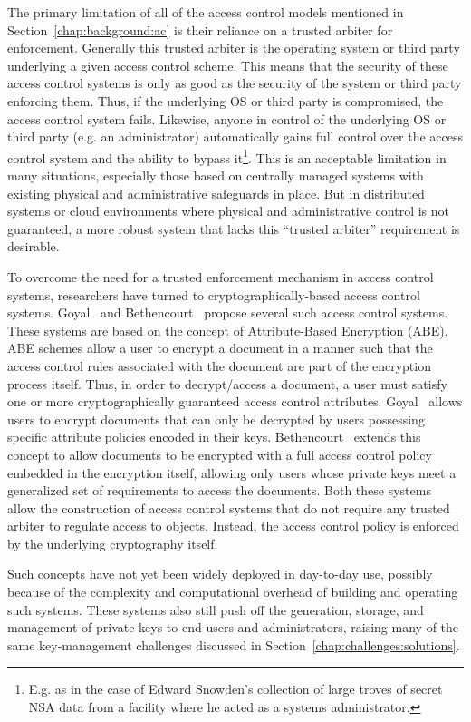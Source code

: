 The primary limitation of all of the access control models mentioned
in Section~\ref{chap:background:ac} is their reliance on a trusted
arbiter for enforcement. Generally this trusted arbiter is the
operating system or third party underlying a given access control
scheme. This means that the security of these access control systems
is only as good as the security of the system or third party enforcing
them. Thus, if the underlying OS or third party is compromised, the
access control system fails. Likewise, anyone in control of the
underlying OS or third party (e.g. an administrator) automatically
gains full control over the access control system and the ability to
bypass it\footnote{E.g. as in the case of Edward Snowden's collection
  of large troves of secret NSA data from a facility where he acted as
  a systems administrator.}. This is an acceptable limitation in many
situations, especially those based on centrally managed systems with
existing physical and administrative safeguards in place. But in
distributed systems or cloud environments where physical and
administrative control is not guaranteed, a more robust system that
lacks this ``trusted arbiter'' requirement is desirable.

To overcome the need for a trusted enforcement mechanism in access
control systems, researchers have turned to cryptographically-based
access control systems. Goyal~\cite{goyal2006} and
Bethencourt~\cite{bethencourt2007} propose several such access control
systems. These systems are based on the concept of Attribute-Based
Encryption (ABE). ABE schemes allow a user to encrypt a document in a
manner such that the access control rules associated with the document
are part of the encryption process itself. Thus, in order to
decrypt/access a document, a user must satisfy one or more
cryptographically guaranteed access control
attributes. Goyal~\cite{goyal2006} allows users to encrypt documents
that can only be decrypted by users possessing specific attribute
policies encoded in their keys. Bethencourt~\cite{bethencourt2007}
extends this concept to allow documents to be encrypted with a full
access control policy embedded in the encryption itself, allowing only
users whose private keys meet a generalized set of requirements to
access the documents. Both these systems allow the construction of
access control systems that do not require any trusted arbiter to
regulate access to objects. Instead, the access control policy is
enforced by the underlying cryptography itself.

Such concepts have not yet been widely deployed in day-to-day use,
possibly because of the complexity and computational overhead of
building and operating such systems. These systems also still push off
the generation, storage, and management of private keys to end users
and administrators, raising many of the same key-management challenges
discussed in Section~\ref{chap:challenges:solutions}.

